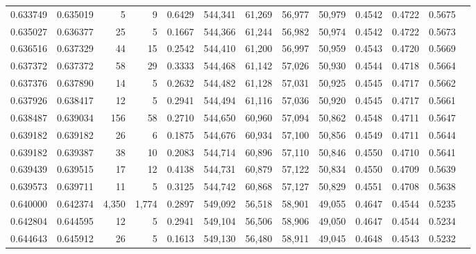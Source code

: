 \begin{tabular}{rrrrrrrrrrrrr}
0.633749 & 0.635019 &      5 &     9 &                                     0.6429 & 544,341 &  61,269 &  56,977 &  50,979 & 0.4542 & 0.4722 & 0.5675 \\
0.635027 & 0.636377 &     25 &     5 &                                     0.1667 & 544,366 &  61,244 &  56,982 &  50,974 & 0.4542 & 0.4722 & 0.5673 \\
0.636516 & 0.637329 &     44 &    15 &                                     0.2542 & 544,410 &  61,200 &  56,997 &  50,959 & 0.4543 & 0.4720 & 0.5669 \\
0.637372 & 0.637372 &     58 &    29 &                                     0.3333 & 544,468 &  61,142 &  57,026 &  50,930 & 0.4544 & 0.4718 & 0.5664 \\
0.637376 & 0.637890 &     14 &     5 &                                     0.2632 & 544,482 &  61,128 &  57,031 &  50,925 & 0.4545 & 0.4717 & 0.5662 \\
0.637926 & 0.638417 &     12 &     5 &                                     0.2941 & 544,494 &  61,116 &  57,036 &  50,920 & 0.4545 & 0.4717 & 0.5661 \\
0.638487 & 0.639034 &    156 &    58 &                                     0.2710 & 544,650 &  60,960 &  57,094 &  50,862 & 0.4548 & 0.4711 & 0.5647 \\
0.639182 & 0.639182 &     26 &     6 &                                     0.1875 & 544,676 &  60,934 &  57,100 &  50,856 & 0.4549 & 0.4711 & 0.5644 \\
0.639182 & 0.639387 &     38 &    10 &                                     0.2083 & 544,714 &  60,896 &  57,110 &  50,846 & 0.4550 & 0.4710 & 0.5641 \\
0.639439 & 0.639515 &     17 &    12 &                                     0.4138 & 544,731 &  60,879 &  57,122 &  50,834 & 0.4550 & 0.4709 & 0.5639 \\
0.639573 & 0.639711 &     11 &     5 &                                     0.3125 & 544,742 &  60,868 &  57,127 &  50,829 & 0.4551 & 0.4708 & 0.5638 \\
0.640000 & 0.642374 &  4,350 & 1,774 &                                     0.2897 & 549,092 &  56,518 &  58,901 &  49,055 & 0.4647 & 0.4544 & 0.5235 \\
0.642804 & 0.644595 &     12 &     5 &                                     0.2941 & 549,104 &  56,506 &  58,906 &  49,050 & 0.4647 & 0.4544 & 0.5234 \\
0.644643 & 0.645912 &     26 &     5 &                                     0.1613 & 549,130 &  56,480 &  58,911 &  49,045 & 0.4648 & 0.4543 & 0.5232 \\

\end{tabular}
